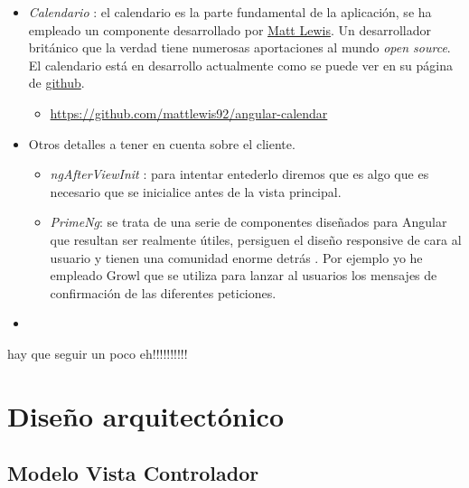 \begin{itemize}
\item \emph{Calendario} : el calendario es la parte fundamental de la aplicación, se ha empleado un componente desarrollado por \href{https://mattlewis.me/}{Matt Lewis}. Un desarrollador británico que la verdad tiene numerosas aportaciones al mundo \emph{open source}. El calendario está en desarrollo actualmente como se puede ver en su página de \href{https://github.com/mattlewis92/angular-calendar}{github}. 
\begin{itemize}
\item \url{https://github.com/mattlewis92/angular-calendar}
\end{itemize}



\item Otros detalles a tener en cuenta sobre el cliente.
\begin{itemize}
	\item \emph{ngAfterViewInit} \cite{afterview} : para intentar entederlo diremos que es algo que es necesario que se inicialice antes de la vista principal. 
	\item \emph{PrimeNg}: se trata de una serie de componentes diseñados para Angular que resultan ser realmente útiles, persiguen el diseño responsive de cara al usuario y tienen una comunidad enorme detrás \cite{prime}. Por ejemplo yo he empleado Growl \cite{growl} que se utiliza para lanzar al usuarios los mensajes de confirmación de las diferentes peticiones.  
\end{itemize}

\item \emph{}

	
\end{itemize}


hay que seguir un poco eh!!!!!!!!!! \cite{accesodatos}


\begin{landscape}

  \end{landscape}

\section{Diseño arquitectónico}\label{darquitectura}



\subsection{Modelo Vista Controlador}\label{modelovista}

